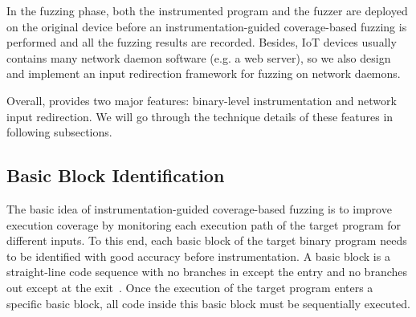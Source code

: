 In the fuzzing phase, both the instrumented program and the fuzzer are deployed on the original device before an instrumentation-guided coverage-based fuzzing is performed and all the fuzzing results are recorded. Besides, IoT devices usually contains many network daemon software (e.g. a web server), so we also design and implement an input redirection framework for fuzzing on network daemons.

Overall, \sysname provides two major features: binary-level instrumentation and network input redirection. We will go through the technique details of these features in following subsections.










\subsection{Basic Block Identification}


The basic idea of instrumentation-guided coverage-based fuzzing is to improve execution coverage by monitoring each execution path of the target program for different inputs. To this end, each basic block of the target binary program needs to be identified with good accuracy before instrumentation. A basic block is a straight-line code sequence with no branches in except the entry and no branches out except at the exit~\cite{hennessy2011computer}. Once the execution of the target program enters a specific basic block, all code inside this basic block must be sequentially executed. 



